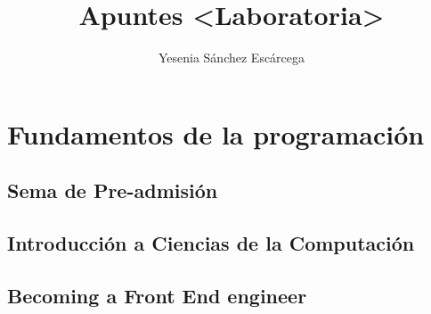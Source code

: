 \documentclass{book}
\title{Apuntes <Laboratoria>}
\author{Yesenia Sánchez Escárcega}
\begin{document}
\maketitle

\part{Fundamentos de la programación}

\chapter{Sema de Pre-admisión}

    

\chapter{Introducción a Ciencias de la Computación}

    

\chapter{Becoming a Front End engineer}

    
\end{document}
